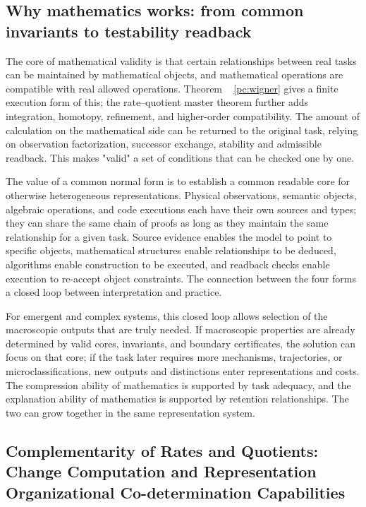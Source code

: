 \documentclass[11pt,a4paper]{article}
\theoremstyle{plain}
\theoremstyle{definition}
\theoremstyle{remark}
\begin{document}
\begin{CJK*}
\subsection { Why mathematics works: from common invariants to testability readback }

The core of mathematical validity is that certain relationships between real tasks can be maintained by mathematical objects, and mathematical operations are compatible with real allowed operations. Theorem ~ \ref{pc:wigner} gives a finite execution form of this; the rate--quotient master theorem further adds integration, homotopy, refinement, and higher-order compatibility. The amount of calculation on the mathematical side can be returned to the original task, relying on observation factorization, successor exchange, stability and admissible readback. This makes "valid" a set of conditions that can be checked one by one.

The value of a common normal form is to establish a common readable core for otherwise heterogeneous representations. Physical observations, semantic objects, algebraic operations, and code executions each have their own sources and types; they can share the same chain of proofs as long as they maintain the same relationship for a given task. Source evidence enables the model to point to specific objects, mathematical structures enable relationships to be deduced, algorithms enable construction to be executed, and readback checks enable execution to re-accept object constraints. The connection between the four forms a closed loop between interpretation and practice.

For emergent and complex systems, this closed loop allows selection of the macroscopic outputs that are truly needed. If macroscopic properties are already determined by valid cores, invariants, and boundary certificates, the solution can focus on that core; if the task later requires more mechanisms, trajectories, or microclassifications, new outputs and distinctions enter representations and costs. The compression ability of mathematics is supported by task adequacy, and the explanation ability of mathematics is supported by retention relationships. The two can grow together in the same representation system.

\subsection { Complementarity of Rates and Quotients: Change Computation and Representation Organizational Co-determination Capabilities }


\end{CJK*}
\end{document}
